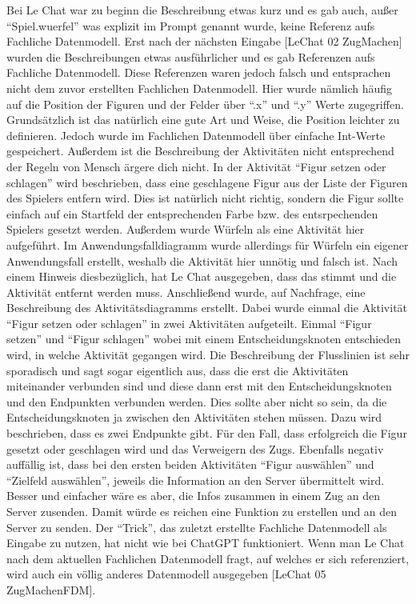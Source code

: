 Bei Le Chat war zu beginn die Beschreibung etwas kurz und es gab auch, außer ``Spiel.wuerfel'' was explizit im Prompt genannt wurde, keine Referenz aufs Fachliche Datenmodell.
Erst nach der nächsten Eingabe [LeChat 02 ZugMachen] wurden die Beschreibungen etwas ausführlicher und es gab Referenzen aufs Fachliche Datenmodell. Diese Referenzen waren 
jedoch falsch und entsprachen nicht dem zuvor erstellten Fachlichen Datenmodell. Hier wurde nämlich häufig auf die Position der Figuren und der Felder über ``.x'' und ``.y''
Werte zugegriffen. Grundsätzlich ist das natürlich eine gute Art und Weise, die Position leichter zu definieren. Jedoch wurde im Fachlichen Datenmodell über einfache Int-Werte
gespeichert. Außerdem ist die Beschreibung der Aktivitäten nicht entsprechend der Regeln von Mensch ärgere dich nicht. In der Aktivität ``Figur setzen oder schlagen'' wird 
beschrieben, dass eine geschlagene Figur aus der Liste der Figuren des Spielers entfern wird. Dies ist natürlich nicht richtig, sondern die Figur sollte einfach auf ein Startfeld 
der entsprechenden Farbe bzw. des entsrpechenden Spielers gesetzt werden. Außerdem wurde Würfeln als eine Aktivität hier aufgeführt. Im Anwendungsfalldiagramm wurde allerdings
für Würfeln ein eigener Anwendungsfall erstellt, weshalb die Aktivität hier unnötig und falsch ist. Nach einem Hinweis diesbezüglich, hat Le Chat ausgegeben, dass das stimmt und
die Aktivität entfernt werden muss. Anschließend wurde, auf Nachfrage, eine Beschreibung des Aktivitätsdiagramms erstellt. Dabei wurde einmal die Aktivität ``Figur setzen oder 
schlagen'' in zwei Aktivitäten aufgeteilt. Einmal ``Figur setzen'' und ``Figur schlagen'' wobei mit einem Entscheidungsknoten entschieden wird, in welche Aktivität gegangen wird.
Die Beschreibung der Flusslinien ist sehr sporadisch und sagt sogar eigentlich aus, dass die erst die Aktivitäten miteinander verbunden sind und diese dann erst mit den 
Entscheidungsknoten und den Endpunkten verbunden werden. Dies sollte aber nicht so sein, da die Entscheidungsknoten ja zwischen den Aktivitäten stehen müssen. Dazu wird beschrieben, 
dass es zwei Endpunkte gibt. Für den Fall, dass erfolgreich die Figur gesetzt oder geschlagen wird und das Verweigern des Zugs. Ebenfalls negativ auffällig ist, dass bei den ersten
beiden Aktivitäten ``Figur auswählen'' und ``Zielfeld auswählen'', jeweils die Information an den Server übermittelt wird. Besser und einfacher wäre es aber, die Infos zusammen in einem
Zug an den Server zusenden. Damit würde es reichen eine Funktion zu erstellen und an den Server zu senden. Der ``Trick'', das zuletzt erstellte Fachliche Datenmodell als Eingabe 
zu nutzen, hat nicht wie bei ChatGPT funktioniert. Wenn man Le Chat nach dem aktuellen Fachlichen Datenmodell fragt, auf welches er sich referenziert, wird auch ein völlig anderes
Datenmodell ausgegeben [LeChat 05 ZugMachenFDM].


